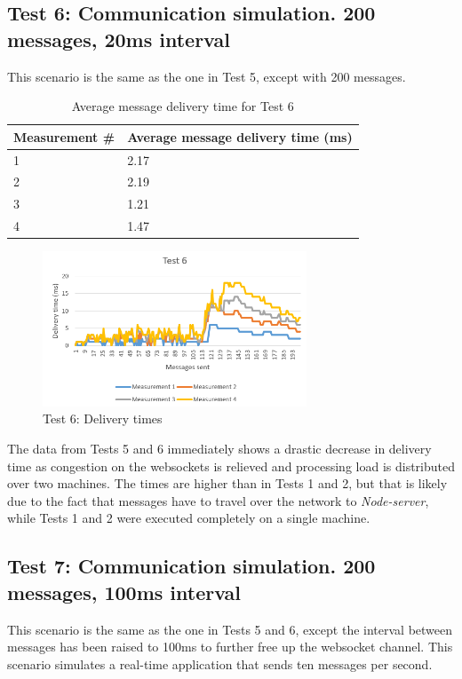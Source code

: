 \clearpage

\subsection{Test 6: Communication simulation. 200 messages, 20ms interval}
This scenario is the same as the one in Test 5, except with 200 messages.

\begin{table}[!ht]
\begin{center}
\begin{tabularx}{0.7\textwidth}{l|l}
\hline
\textbf{Measurement \#} & \textbf{Average message delivery time (ms)} \\
\hline
1 & 2.17\\
\hline
2 & 2.19\\
\hline
3 & 1.21\\
\hline
4 & 1.47\\
\hline
\end{tabularx}
\end{center}
\caption{Average message delivery time for Test 6}
\label{tab:test-perf6}
\end{table}

\begin{figure}[!ht]
	\centering
	\includegraphics[width=0.7\textwidth]{figures/05_testing/test-perf6}
    \caption{Test 6: Delivery times}
    \label{fig:test-perf6}
\end{figure}

The data from Tests 5 and 6 immediately shows a drastic decrease in delivery time as congestion on the websockets is relieved and processing load is distributed over two machines. The times are higher than in Tests 1 and 2, but that is likely due to the fact that messages have to travel over the network to \textit{Node-server}, while Tests 1 and 2 were executed completely on a single machine.

\clearpage

\subsection{Test 7: Communication simulation. 200 messages, 100ms interval}
This scenario is the same as the one in Tests 5 and 6, except the interval between messages has been raised to 100ms to further free up the websocket channel. This scenario simulates a real-time application that sends ten messages per second.

